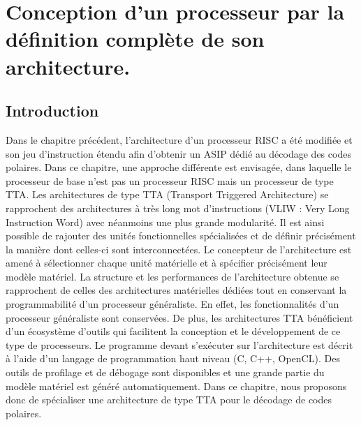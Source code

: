 \chapter{Conception d'un processeur par la définition complète de son architecture.} %
\label{chap:tta}

\vspace*{\fill}
\minitocTITI
\vspace*{\fill}
\newpage


\section*{Introduction}
Dans le chapitre précédent, l'architecture d'un processeur RISC a été modifiée et son jeu d'instruction étendu afin d'obtenir un ASIP dédié au décodage des codes polaires. Dans ce chapitre, une approche différente est envisagée, dans laquelle le processeur de base n'est pas un processeur RISC mais un processeur de type TTA.
Les architectures de type TTA (Transport Triggered Architecture) se rapprochent des architectures à très long mot d'instructions (VLIW : Very Long Instruction Word) avec néanmoins une plus grande modularité. Il est ainsi possible de rajouter des unités fonctionnelles spécialisées et de définir précisément la manière dont celles-ci sont interconnectées. Le concepteur de l'architecture est amené à sélectionner chaque unité matérielle et à spécifier précisément leur modèle matériel. La structure et les performances de l'architecture obtenue se rapprochent de celles des architectures matérielles dédiées tout en conservant la programmabilité d'un processeur généraliste. En effet, les fonctionnalités d'un processeur généraliste sont conservées. De plus, les architectures TTA bénéficient d'un écosystème d'outils qui facilitent la conception et le développement de ce type de processeurs. Le programme devant s'exécuter sur l'architecture est décrit à l'aide d'un langage de programmation haut niveau  (C, C++, OpenCL). Des outils de profilage et de débogage sont disponibles et une grande partie du modèle matériel est généré automatiquement. Dans ce chapitre, nous proposons donc de spécialiser une architecture de type TTA pour le décodage de codes polaires.

